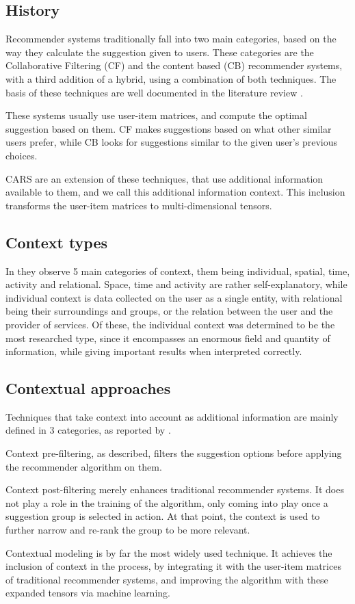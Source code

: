 \documentclass{article}
\begin{document}
\subsection{History}
    Recommender systems traditionally fall into two main categories, based on the way they calculate the suggestion given to users. These categories are the Collaborative Filtering (CF) and the content based (CB) recommender systems, with a third addition of a hybrid, using a combination of both techniques. The basis of these techniques are well documented in the literature review \cite{villegas2018characterizing}.
    \par These systems usually use user-item matrices, and compute the optimal suggestion based on them. CF makes suggestions based on what other similar users prefer, while CB looks for suggestions similar to the given user's previous choices.
    \par CARS are an extension of these techniques, that use additional information available to them, and we call this additional information context. This inclusion transforms the user-item matrices to multi-dimensional tensors.
\subsection{Context types}
    In \cite{mateos2024systematic} they observe 5 main categories of context, them being individual, spatial, time, activity and relational. Space, time and activity are rather self-explanatory, while individual context is data collected on the user as a single entity, with relational being their surroundings and groups, or the relation between the user and the provider of services. Of these, the individual context was determined to be the most researched type, since it encompasses an enormous field and quantity of information, while giving important results when interpreted correctly.
\subsection{Contextual approaches}
    Techniques that take context into account as additional information are mainly defined in 3 categories, as reported by \cite{mateos2024systematic}.
    \par Context pre-filtering, as described, filters the suggestion options before applying the recommender algorithm on them.
    \par Context post-filtering merely enhances traditional recommender systems. It does not play a role in the training of the algorithm, only coming into play once a suggestion group is selected in action. At that point, the context is used to further narrow and re-rank the group to be more relevant.
    \par Contextual modeling is by far the most widely used technique. It achieves the inclusion of context in the process, by integrating it with the user-item matrices of traditional recommender systems, and improving the algorithm with these expanded tensors via machine learning.
\end{document}

